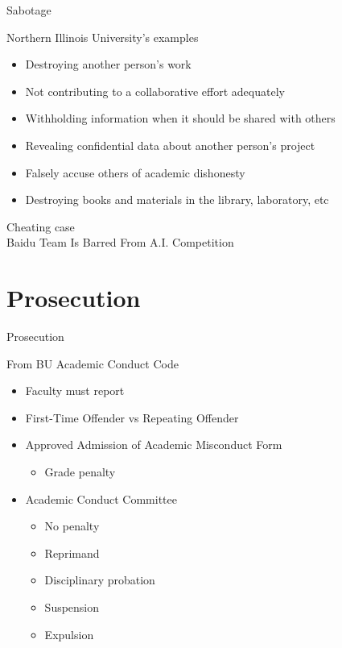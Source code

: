		\begin{frame}{Sabotage}
				
			Northern Illinois University's examples

			\begin{itemize}
				\item 
					Destroying another person's work
				\item 
					Not contributing to a collaborative effort adequately
				\item 
					Withholding information when it should be shared with others
				\item 
					Revealing confidential data about another person's project
				\item 
					Falsely accuse others of academic dishonesty
				\item
					Destroying books and materials in the library, laboratory, etc
			\end{itemize}

		\end{frame}

		\begin{frame}[standout]
			
			Cheating case \\
			Baidu Team Is Barred From A.I. Competition~\cite{baidu-cheating}


		\end{frame}

\section{Prosecution}

	\begin{frame}{Prosecution}

		From BU Academic Conduct Code

		\begin{itemize}
			\item 
				Faculty must report
			\item 
				First-Time Offender vs Repeating Offender
			\item 
				Approved Admission of Academic Misconduct Form
				\begin{itemize}
					\item 
						Grade penalty
				\end{itemize}
			\item
				Academic Conduct Committee
				\begin{itemize}
					\item 
						No penalty
					\item 
						Reprimand
					\item 
						Disciplinary probation
					\item
						Suspension
					\item
						Expulsion
				\end{itemize}
		\end{itemize}

	\end{frame}
